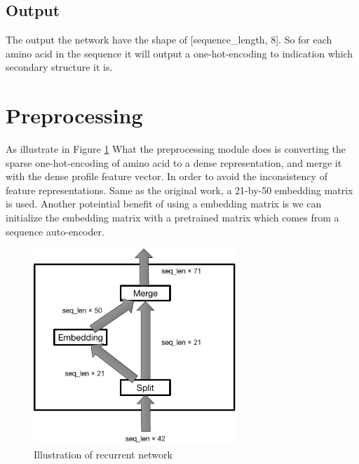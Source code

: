 \subsection{Output}
The output the network have the shape of [sequence\_length, 8]. So for each amino acid in the sequence it will output a one-hot-encoding to indication which secondary structure it is.


\section{Preprocessing}
As illustrate in Figure \ref{fig:pre} What the preprocessing module does is converting the sparse one-hot-encoding of amino acid to a dense representation, and merge it with the dense profile feature vector. In order to avoid the inconsistency of feature representations. Same as the original work, a 21-by-50 embedding matrix is used. 
Another poteintial benefit of using a embedding matrix is we can initialize the embedding matrix with a pretrained matrix which comes from a sequence auto-encoder.

\begin{figure}[H] 
	\centering
	\includegraphics[width=3in]{Figures/preprocessing}
	\caption[Detail inside recurrent unit]{Illustration of recurrent network}
	\label{fig:pre}
\end{figure}

